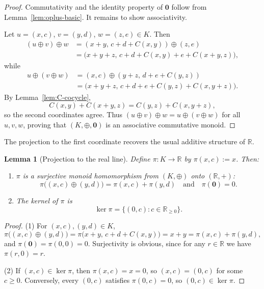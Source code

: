 \documentclass[11pt]{amsart}
\numberwithin{equation}{section}
\newtheorem{lemma}[theorem]{Lemma}
\theoremstyle{definition}
\theoremstyle{remark}
\newcommand{\R}{\mathbb{R}}
\newcommand{\Kamb}{K}                      %
\newcommand{\Cfun}{C}                      %
\begin{document}
\begin{proof}
Commutativity and the identity property of $\mathbf{0}$ follow from
Lemma~\ref{lem:oplus-basic}.  It remains to show associativity.

Let $u=(x,c)$, $v=(y,d)$, $w=(z,e)\in\Kamb$.  Then
\begin{align*}
  (u\oplus v)\oplus w
  &= (x+y,\,c+d+\Cfun(x,y))\oplus(z,e)\\
  &= \bigl(x+y+z,\,
            c+d+\Cfun(x,y)+e+\Cfun(x+y,z)\bigr),
\end{align*}
while
\begin{align*}
  u\oplus(v\oplus w)
  &= (x,c)\oplus(y+z,\,d+e+\Cfun(y,z))\\
  &= \bigl(x+y+z,\,
            c+d+e+\Cfun(y,z)+\Cfun(x,y+z)\bigr).
\end{align*}
By Lemma~\ref{lem:C-cocycle},
\[
  \Cfun(x,y)+\Cfun(x+y,z)
  = \Cfun(y,z)+\Cfun(x,y+z),
\]
so the second coordinates agree.  Thus
$(u\oplus v)\oplus w=u\oplus(v\oplus w)$ for all $u,v,w$, proving that
$(\Kamb,\oplus,\mathbf{0})$ is an associative commutative monoid.
\end{proof}

The projection to the first coordinate recovers the usual additive
structure of $\R$.

\begin{lemma}[Projection to the real line]\label{lem:Kamb-projection}
Define $\pi:\Kamb\to\R$ by $\pi(x,c):=x$.  Then:
\begin{enumerate}
  \item $\pi$ is a surjective monoid homomorphism from
        $(\Kamb,\oplus)$ onto $(\R,+)$:
  \[
    \pi\bigl((x,c)\oplus(y,d)\bigr)
    = \pi(x,c)+\pi(y,d)
    \quad\text{and}\quad
    \pi(\mathbf{0})=0.
  \]
  \item The kernel of $\pi$ is
  \[
    \ker\pi = \{(0,c):c\in\R_{\ge0}\}.
  \]
\end{enumerate}
\end{lemma}

\begin{proof}
(1) For $(x,c),(y,d)\in\Kamb$,
\[
  \pi\bigl((x,c)\oplus(y,d)\bigr)
  = \pi\bigl(x+y,\,c+d+\Cfun(x,y)\bigr)
  = x+y
  = \pi(x,c)+\pi(y,d),
\]
and $\pi(\mathbf{0})=\pi(0,0)=0$.  Surjectivity is obvious, since for
any $r\in\R$ we have $\pi(r,0)=r$.

(2) If $(x,c)\in\ker\pi$, then $\pi(x,c)=x=0$, so
$(x,c)=(0,c)$ for some $c\ge0$.  Conversely, every $(0,c)$ satisfies
$\pi(0,c)=0$, so $(0,c)\in\ker\pi$.
\end{proof}
\end{document}
